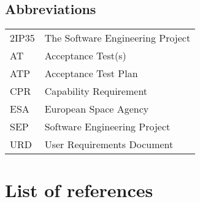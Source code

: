 \subsection{Abbreviations}
\label{subsec:abbrev}
\begin{tabular}{l|l}
2IP35 & The Software Engineering Project \\
AT & Acceptance Test(s) \\
ATP & Acceptance Test Plan \\
CPR & Capability Requirement \\
ESA & European Space Agency \\
SEP   & Software Engineering Project \\
URD   & User Requirements Document \\
\end{tabular}

\section{List of references}
